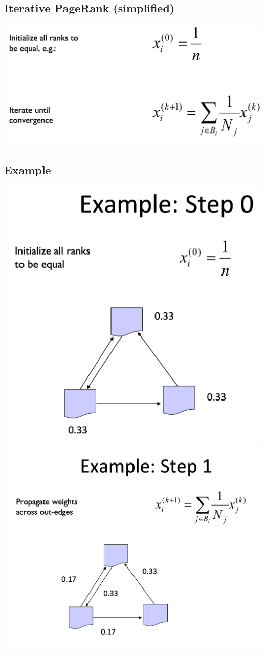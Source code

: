 \documentclass[11pt]{article}
\theoremstyle{definition}
\begin{document}
\subsection{Iterative PageRank (simplified)}
\includegraphics[width=\textwidth/2]{27.png}

\subsection{Example}
\includegraphics[width=\textwidth/3]{29.png}
\includegraphics[width=\textwidth/2]{30.png}
\end{document}
